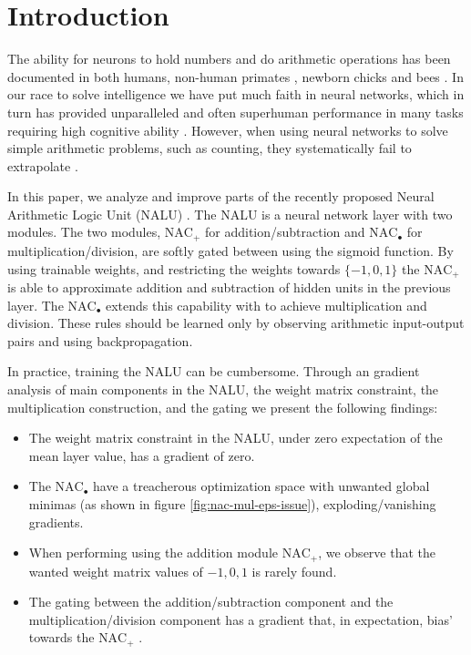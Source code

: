 \section{Introduction}

The ability for neurons to hold numbers and do arithmetic operations has been documented in both humans, non-human primates \cite{nieder-neuronal-number}, newborn chicks \cite{rugani-arithmetic-chicks} and bees \cite{gallistel-numbers-in-brain}.
In our race to solve intelligence we have put much faith in neural networks, which in turn has provided unparalleled and often superhuman performance in many tasks requiring high cognitive ability \cite{natureGo,googleNMT,resnet}.
However, when using neural networks to solve simple arithmetic problems, such as counting, they systematically fail to extrapolate \cite{stillNotSystematic,suzgun2019evaluating,trask-nalu}.

In this paper, we analyze and improve parts of the recently proposed Neural Arithmetic Logic Unit (NALU) \cite{trask-nalu}.
The NALU is a neural network layer with two modules.
The two modules, $\text{NAC}_{+}$ for addition/subtraction and $\text{NAC}_{\bullet}$ for multiplication/division, are softly gated between using the sigmoid function.
By using trainable weights, and restricting the weights towards $\{-1,0,1\}$ the $\text{NAC}_{+}$ is able to approximate addition and subtraction of hidden units in the previous layer.
The $\text{NAC}_{\bullet}$ extends this capability with to achieve multiplication and division. 
These rules should be learned only by observing arithmetic input-output pairs and using backpropagation\cite{rumelhart1986learning}.

In practice, training the NALU can be cumbersome.
Through an gradient analysis of main components in the NALU, the weight matrix constraint, the multiplication construction, and the gating we present the following findings:

\begin{itemize}
\item The weight matrix constraint in the NALU, under zero expectation of the mean layer value\cite{glorot-initialization}, has a gradient of zero.

\item The $\text{NAC}_{\bullet}$ have a treacherous optimization space with unwanted global minimas (as shown in figure \ref{fig:nac-mul-eps-issue}), exploding/vanishing gradients.

\item When performing using the addition module $\text{NAC}_{+}$, we observe that the wanted weight matrix values of ${-1, 0, 1}$ is rarely found.

\item The gating between the addition/subtraction component and the multiplication/division component has a gradient that, in expectation, bias' towards the $\text{NAC}_{\text{+}}$ .
\end{itemize}

